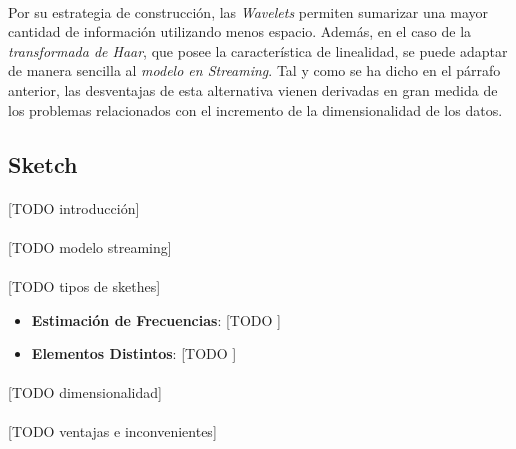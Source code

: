 \documentclass{subfiles}
\begin{document}
        \paragraph{}
        Por su estrategia de construcción, las \emph{Wavelets} permiten sumarizar una mayor cantidad de información utilizando menos espacio. Además, en el caso de la \emph{transformada de Haar}, que posee la característica de linealidad, se puede adaptar de manera sencilla al \emph{modelo en Streaming}. Tal y como se ha dicho en el párrafo anterior, las desventajas de esta alternativa vienen derivadas en gran medida de los problemas relacionados con el incremento de la dimensionalidad de los datos.

      \subsection{Sketch}
      \label{sec:sketch}

        \paragraph{}
        [TODO introducción]

        \paragraph{}
        [TODO modelo streaming]

        \paragraph{}
        [TODO tipos de skethes]

        \begin{itemize}

          \item \textbf{Estimación de Frecuencias}: [TODO ]

          \item \textbf{Elementos Distintos}: [TODO ]

        \end{itemize}

        \paragraph{}
        [TODO dimensionalidad]


        \paragraph{}
        [TODO ventajas e inconvenientes]
\end{document}
